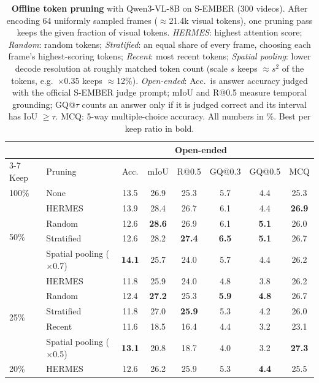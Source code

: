 \begin{table}[t]
\centering
\setlength{\tabcolsep}{8pt}
\caption{\textbf{Offline token pruning} with Qwen3-VL-8B on S-EMBER (300 videos). After encoding 64 uniformly sampled frames ($\approx$21.4k visual tokens), one pruning pass keeps the given fraction of visual tokens. \emph{HERMES}: highest attention score; \emph{Random}: random tokens; \emph{Stratified}: an equal share of every frame, choosing each frame's highest-scoring tokens; \emph{Recent}: most recent tokens; \emph{Spatial pooling}: lower decode resolution at roughly matched token count (scale $s$ keeps $\approx s^2$ of the tokens, e.g.\ $\times$0.35 keeps $\approx$12\%). \emph{Open-ended}: Acc.\ is answer accuracy judged with the official S-EMBER judge prompt; mIoU and R@0.5 measure temporal grounding; GQ@$\tau$ counts an answer only if it is judged correct and its interval has IoU $\geq \tau$. MCQ: 5-way multiple-choice accuracy. All numbers in \%. Best per keep ratio in bold.}
\label{tab:offline-pruning}
\begin{tabular}{llcccccc}
\toprule
& & \multicolumn{5}{c}{Open-ended} & \\
\cmidrule(lr){3-7}
Keep & Pruning & Acc. & mIoU & R@0.5 & GQ@0.3 & GQ@0.5 & MCQ \\
\midrule
100\% & None & 13.5 & 26.9 & 25.3 & 5.7 & 4.4 & 25.3 \\
\midrule
\multirow{4}{*}{50\%} & HERMES & 13.9 & 28.4 & 26.7 & 6.1 & 4.4 & \textbf{26.9} \\
 & Random & 12.6 & \textbf{28.6} & 26.9 & 6.1 & \textbf{5.1} & 26.0 \\
 & Stratified & 12.6 & 28.2 & \textbf{27.4} & \textbf{6.5} & \textbf{5.1} & 26.7 \\
 & Spatial pooling ($\times$0.7) & \textbf{14.1} & 25.7 & 24.0 & 5.7 & 4.4 & 26.2 \\
\midrule
\multirow{5}{*}{25\%} & HERMES & 11.8 & 25.9 & 24.0 & 4.8 & 3.8 & 26.2 \\
 & Random & 12.4 & \textbf{27.2} & 25.3 & \textbf{5.9} & \textbf{4.8} & 26.7 \\
 & Stratified & 11.8 & 27.0 & \textbf{25.9} & 5.3 & 4.2 & 26.0 \\
 & Recent & 11.6 & 18.5 & 16.4 & 4.4 & 3.2 & 23.1 \\
 & Spatial pooling ($\times$0.5) & \textbf{13.1} & 20.8 & 18.7 & 4.0 & 3.2 & \textbf{27.3} \\
\midrule
\multirow{4}{*}{20\%} & HERMES & 12.6 & 26.2 & 25.9 & 5.3 & \textbf{4.4} & 25.5 \\

\end{tabular}
\end{table}
